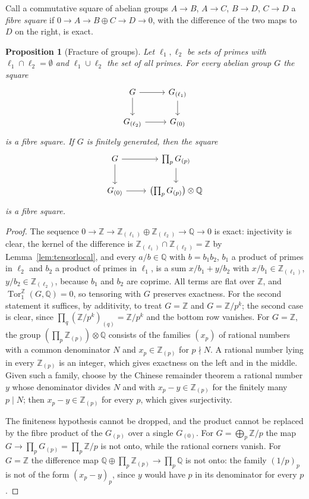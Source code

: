 \documentclass[11pt]{amsart}
\theoremstyle{plain}
\newtheorem{proposition}[theorem]{Proposition}
\theoremstyle{definition}
\numberwithin{equation}{section}
\newcommand{\Z}{\mathbb{Z}}
\newcommand{\Q}{\mathbb{Q}}
\newcommand{\Zp}{\mathbb{Z}_{(p)}}
\DeclareMathOperator{\Tor}{Tor}
\begin{document}
Call a commutative square of abelian groups $A\to B$, $A\to C$, $B\to D$, $C\to D$ a \emph{fibre square} if $0\to A\to B\oplus C\to D\to0$, with the difference of the two maps to $D$ on the right, is exact.

\begin{proposition}[Fracture of groups]\label{prop:fracturegroups}
Let $\ell_1,\ell_2$ be sets of primes with $\ell_1\cap\ell_2=\emptyset$ and $\ell_1\cup\ell_2$ the set of all primes.
For every abelian group $G$ the square
\[
\begin{tikzcd}
G\arrow[r]\arrow[d] & G_{(\ell_1)}\arrow[d]\\
G_{(\ell_2)}\arrow[r] & G_{(0)}
\end{tikzcd}
\]
is a fibre square.
If $G$ is finitely generated, then the square
\[
\begin{tikzcd}
G\arrow[r]\arrow[d] & \prod_pG_{(p)}\arrow[d]\\
G_{(0)}\arrow[r] & \bigl(\prod_pG_{(p)}\bigr)\otimes\Q
\end{tikzcd}
\]
is a fibre square.
\end{proposition}

\begin{proof}
The sequence $0\to\Z\to\Z_{(\ell_1)}\oplus\Z_{(\ell_2)}\to\Q\to0$ is exact: injectivity is clear, the kernel of the difference is $\Z_{(\ell_1)}\cap\Z_{(\ell_2)}=\Z$ by Lemma~\ref{lem:tensorlocal}, and every $a/b\in\Q$ with $b=b_1b_2$, $b_1$ a product of primes in $\ell_2$ and $b_2$ a product of primes in $\ell_1$, is a sum $x/b_1+y/b_2$ with $x/b_1\in\Z_{(\ell_1)}$, $y/b_2\in\Z_{(\ell_2)}$, because $b_1$ and $b_2$ are coprime.
All terms are flat over $\Z$, and $\Tor_1^\Z(G,\Q)=0$, so tensoring with $G$ preserves exactness.
For the second statement it suffices, by additivity, to treat $G=\Z$ and $G=\Z/p^k$; the second case is clear, since $\prod_q(\Z/p^k)_{(q)}=\Z/p^k$ and the bottom row vanishes.
For $G=\Z$, the group $(\prod_p\Zp)\otimes\Q$ consists of the families $(x_p)$ of rational numbers with a common denominator $N$ and $x_p\in\Zp$ for $p\nmid N$.
A rational number lying in every $\Zp$ is an integer, which gives exactness on the left and in the middle.
Given such a family, choose by the Chinese remainder theorem a rational number $y$ whose denominator divides $N$ and with $x_p-y\in\Zp$ for the finitely many $p\mid N$; then $x_p-y\in\Zp$ for every $p$, which gives surjectivity.

The finiteness hypothesis cannot be dropped, and the product cannot be replaced by the fibre product of the $G_{(p)}$ over a single $G_{(0)}$.
For $G=\bigoplus_p\Z/p$ the map $G\to\prod_pG_{(p)}=\prod_p\Z/p$ is not onto, while the rational corners vanish.
For $G=\Z$ the difference map $\Q\oplus\prod_p\Zp\to\prod_p\Q$ is not onto: the family $(1/p)_p$ is not of the form $(x_p-y)_p$, since $y$ would have $p$ in its denominator for every $p$.
\end{proof}
\end{document}
